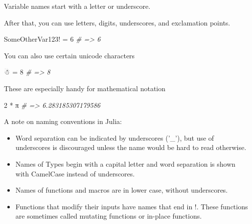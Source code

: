 \documentclass[ignorenonframetext,]{beamer}
\newenvironment{Shaded}{}{}
\newcommand{\FloatTok}[1]{\textcolor[rgb]{0.25,0.63,0.44}{{#1}}}
\newcommand{\CommentTok}[1]{\textcolor[rgb]{0.38,0.63,0.69}{\textit{{#1}}}}
\newcommand{\NormalTok}[1]{{#1}}
\begin{document}
\begin{frame}[fragile]{Variable names start with a letter or
underscore.}

After that, you can use letters, digits, underscores, and exclamation
points.

\begin{Shaded}
\begin{Highlighting}[]
\NormalTok{SomeOtherVar123! = }\FloatTok{6} \CommentTok{# => 6}
\end{Highlighting}
\end{Shaded}

\end{frame}

\begin{frame}[fragile]{You can also use certain unicode characters}

\begin{Shaded}
\begin{Highlighting}[]
\NormalTok{☃ = }\FloatTok{8} \CommentTok{# => 8}
\end{Highlighting}
\end{Shaded}

These are especially handy for mathematical notation

\begin{Shaded}
\begin{Highlighting}[]
\FloatTok{2} \NormalTok{* π }\CommentTok{# => 6.283185307179586}
\end{Highlighting}
\end{Shaded}

\end{frame}

\begin{frame}{A note on naming conventions in Julia:}

\begin{itemize}
\item
  Word separation can be indicated by underscores ('\_'), but use of
  underscores is discouraged unless the name would be hard to read
  otherwise.
\item
  Names of Types begin with a capital letter and word separation is
  shown with CamelCase instead of underscores.
\item
  Names of functions and macros are in lower case, without underscores.
\item
  Functions that modify their inputs have names that end in !. These
  functions are sometimes called mutating functions or in-place
  functions.
\end{itemize}

\end{frame}
\end{document}
